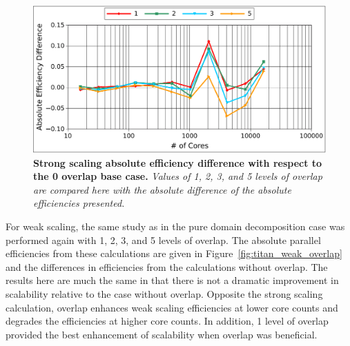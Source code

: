 \begin{figure}[t!]
  \begin{center}
    \includegraphics[width=6in]{chapters/parallel_mc/titan_strong_overlap_diff.pdf}
  \end{center}
  \caption{\textbf{Strong scaling absolute efficiency difference with
      respect to the 0 overlap base case.} \textit{Values of 1, 2, 3,
      and 5 levels of overlap are compared here with the absolute
      difference of the absolute efficiencies presented.}}
  \label{fig:titan_strong_overlap_diff}
\end{figure}

For weak scaling, the same study as in the pure domain decomposition
case was performed again with 1, 2, 3, and 5 levels of overlap. The
absolute parallel efficiencies from these calculations are given in
Figure~\ref{fig:titan_weak_overlap} and the differences in
efficiencies from the calculations without overlap. The results here
are much the same in that there is not a dramatic improvement in
scalability relative to the case without overlap. Opposite the strong
scaling calculation, overlap enhances weak scaling efficiencies at
lower core counts and degrades the efficiencies at higher core
counts. In addition, 1 level of overlap provided the best enhancement
of scalability when overlap was beneficial. 

